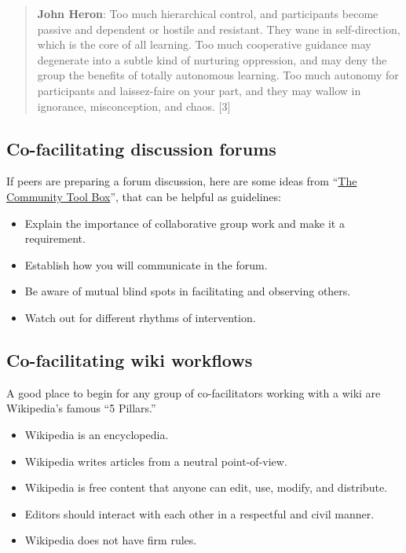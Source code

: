 \begin{quote}
\textbf{John Heron}: Too much hierarchical control, and participants
become passive and dependent or hostile and resistant. They wane in
self-direction, which is the core of all learning. Too much cooperative
guidance may degenerate into a subtle kind of nurturing oppression, and
may deny the group the benefits of totally autonomous learning. Too much
autonomy for participants and laissez-faire on your part, and they may
wallow in ignorance, misconception, and chaos. {[}3{]}
\end{quote}
\subsection{Co-facilitating discussion forums}

If peers are preparing a forum discussion, here are some ideas from
``\href{http://ctb.ku.edu/en/tablecontents/section\_1180.aspx}{The
Community Tool Box}'', that can be helpful as guidelines:

\begin{itemize}
\item
  Explain the importance of collaborative group work and make it a
  requirement.
\item
  Establish how you will communicate in the forum.
\item
  Be aware of mutual blind spots in facilitating and observing others.
\item
  Watch out for different rhythms of intervention.
\end{itemize}
\subsection{Co-facilitating wiki workflows}

A good place to begin for any group of co-facilitators working with a
wiki are Wikipedia's famous ``5 Pillars.''

\begin{itemize}
\item
  Wikipedia is an encyclopedia.
\item
  Wikipedia writes articles from a neutral point-of-view.
\item
  Wikipedia is free content that anyone can edit, use, modify, and
  distribute.
\item
  Editors should interact with each other in a respectful and civil
  manner.
\item
  Wikipedia does not have firm rules.
\end{itemize}
